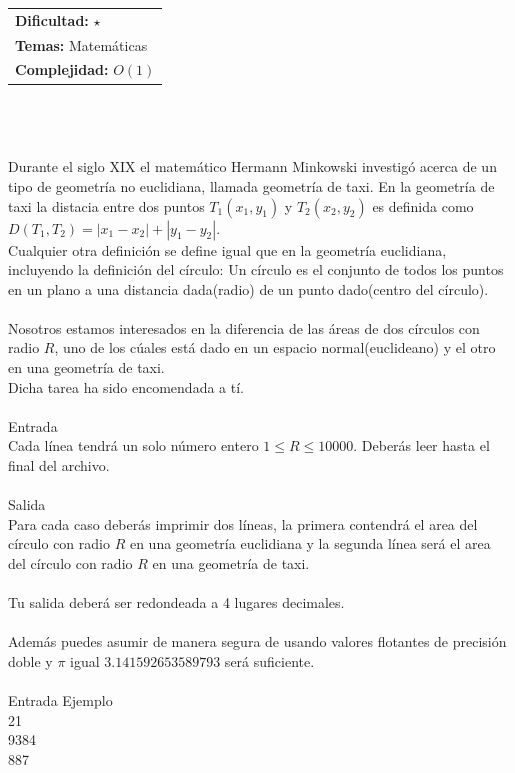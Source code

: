 \documentclass[12pt]{article}
\begin{document}
\hfill
\begin{tabular}{@{}l@{}}
\textbf{Dificultad:} $\star$ \\
\textbf{Temas:} Matemáticas \\
\textbf{Complejidad:} $O(1)$
\end{tabular}\\
\\
\\
Durante el siglo XIX el matemático Hermann Minkowski investigó acerca de un tipo de geometría no euclidiana, llamada geometría de taxi. En la geometría de taxi la distacia entre dos puntos $T_1(x_1, y_1)$ y $T_2(x_2, y_2)$ es definida
como $D(T_1, T_2) = |x_1 − x_2| + |y_1 − y_2|$. \\Cualquier otra definición se define igual que en la geometría euclidiana, incluyendo la definición del círculo: Un círculo es el conjunto de todos los puntos en un plano a una distancia dada(radio) de un punto dado(centro del círculo). \\ \\Nosotros estamos interesados en la diferencia de las áreas de dos
círculos con radio $R$, uno de los cúales está dado en un espacio normal(euclideano) y el otro en una geometría de taxi.\\ Dicha tarea ha sido encomendada a tí.\\
\\
\textrm{\large Entrada}
\\
Cada línea tendrá un solo número entero $1 ≤ R ≤ 10000$. Deberás leer hasta el final del archivo.\\
\\
\textrm{\large Salida}
\\
Para cada caso deberás imprimir dos líneas, la primera contendrá el area del círculo con radio $R$ en una geometría euclidiana y la segunda línea será el area del círculo con radio $R$ en una geometría de taxi. \\ 
\\Tu salida deberá ser redondeada a 4 lugares decimales.\\ 
\\Además puedes asumir de manera segura de usando valores flotantes de precisión doble y $\pi$ igual $3.141592653589793$ será suficiente.
\\
\\
\textrm{\large Entrada Ejemplo}
\\
21\\
9384\\
887\\
\end{document}
